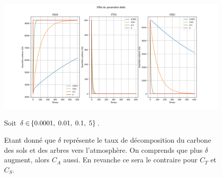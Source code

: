 \documentclass[12pt]{article}
\theoremstyle{saav}
\newcommand{\acc}[1]{\hspace{-0.05cm}\left\{#1 \right\}}
\begin{document}
	\begin{figure}[h]
		\centering
			\begin{minipage}[h]{\linewidth}
			\centering
			\includegraphics[width=\linewidth]{images/delta_var.png}
			\end{minipage}
			\par\vspace{0.5em}
			
			Soit $\delta \in \acc{0.0001,\hspace{1mm} 0.01,\hspace{1mm} 0.1,\hspace{1mm} 5} $.
			
			Etant donné que $\delta$ représente le taux de décomposition du carbone des sols et des arbres vers l'atmosphère. On comprends que plus $\delta$ augment, alors $C_{A}$ aussi. En revanche ce sera le contraire pour $C_{T}$ et $C_{S}$.
			
	\end{figure}
	
\end{document}
